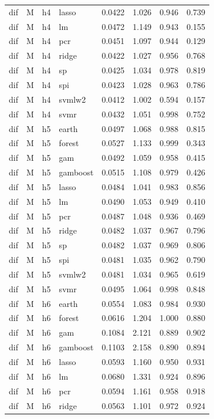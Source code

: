 \begin{ThreePartTable}
\begin{longtable}[t]{llclcccc}
dif & M & h4 & lasso & 0.0422 & 1.026 & 0.946 & 0.739\\
dif & M & h4 & lm & 0.0472 & 1.149 & 0.943 & 0.155\\
dif & M & h4 & pcr & 0.0451 & 1.097 & 0.944 & 0.129\\
dif & M & h4 & ridge & 0.0422 & 1.027 & 0.956 & 0.768\\
dif & M & h4 & sp & 0.0425 & 1.034 & 0.978 & 0.819\\
dif & M & h4 & spi & 0.0423 & 1.028 & 0.963 & 0.786\\
dif & M & h4 & svmlw2 & 0.0412 & 1.002 & 0.594 & 0.157\\
dif & M & h4 & svmr & 0.0432 & 1.051 & 0.998 & 0.752\\
\addlinespace
dif & M & h5 & earth & 0.0497 & 1.068 & 0.988 & 0.815\\
dif & M & h5 & forest & 0.0527 & 1.133 & 0.999 & 0.343\\
dif & M & h5 & gam & 0.0492 & 1.059 & 0.958 & 0.415\\
dif & M & h5 & gamboost & 0.0515 & 1.108 & 0.979 & 0.426\\
dif & M & h5 & lasso & 0.0484 & 1.041 & 0.983 & 0.856\\
dif & M & h5 & lm & 0.0490 & 1.053 & 0.949 & 0.410\\
dif & M & h5 & pcr & 0.0487 & 1.048 & 0.936 & 0.469\\
dif & M & h5 & ridge & 0.0482 & 1.037 & 0.967 & 0.796\\
dif & M & h5 & sp & 0.0482 & 1.037 & 0.969 & 0.806\\
dif & M & h5 & spi & 0.0481 & 1.035 & 0.962 & 0.790\\
dif & M & h5 & svmlw2 & 0.0481 & 1.034 & 0.965 & 0.619\\
dif & M & h5 & svmr & 0.0495 & 1.064 & 0.998 & 0.848\\
\addlinespace
dif & M & h6 & earth & 0.0554 & 1.083 & 0.984 & 0.930\\
dif & M & h6 & forest & 0.0616 & 1.204 & 1.000 & 0.880\\
dif & M & h6 & gam & 0.1084 & 2.121 & 0.889 & 0.902\\
dif & M & h6 & gamboost & 0.1103 & 2.158 & 0.890 & 0.894\\
dif & M & h6 & lasso & 0.0593 & 1.160 & 0.950 & 0.931\\
dif & M & h6 & lm & 0.0680 & 1.331 & 0.924 & 0.896\\
dif & M & h6 & pcr & 0.0594 & 1.161 & 0.958 & 0.918\\
dif & M & h6 & ridge & 0.0563 & 1.101 & 0.972 & 0.924\\

\end{longtable}
\end{ThreePartTable}
